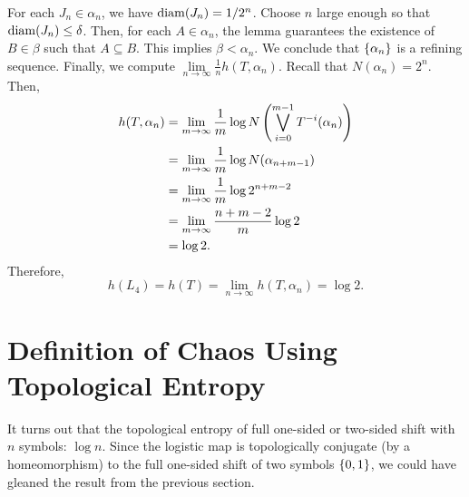 \documentclass[12pt,twoside,draft]{book}
\begin{document}
  For each $J_n \in \alpha_n$, we have $\mathrm{diam}(J_n) = 1/{2^n}$.
  Choose $n$ large enough so that $\mathrm{diam}(J_n) \leq \delta$.
  Then, for each $A \in \alpha_n$, the lemma guarantees the existence of $B \in \beta$ such that $A \subseteq B$.
  This implies $\beta < \alpha_n$.
  We conclude that $\left \{ \alpha_n \right \}$ is a refining sequence.
  Finally, we compute $\lim\limits_{n \to \infty} \frac{1}{n} h(T, \alpha_n)$.
  Recall that $N(\alpha_{n}) = 2^n$.
  Then,
  \begin{align*}
    h(T, \alpha_n)
    &= \lim\limits_{m \to \infty} \frac{1}{m} \log N\left (  \bigvee\limits_{i = 0}^{m-1} T^{-i}(\alpha_n) \right )  \\
    &= \lim\limits_{m \to \infty} \frac{1}{m} \log N(\alpha_{n+m-1})  \\
    &= \lim\limits_{m \to \infty} \frac{1}{m} \log 2^{n + m - 2}  \\
    &= \lim\limits_{m \to \infty} \frac{n + m - 2}{m} \log 2 \\
    &= \log 2.
  \end{align*}
  Therefore,
  \begin{equation*}
    h(L_4) = h(T) = \lim\limits_{n \to \infty} h(T, \alpha_n) = \log 2.
  \end{equation*}

  \section{Definition of Chaos Using Topological Entropy}
  It turns out that the topological entropy of full one-sided or two-sided shift with $n$ symbols: $\log n$. \citep[p.177]{walters}
  Since the logistic map is topologically conjugate (by a homeomorphism) to the full one-sided shift of two symbols $\left \{ 0,1 \right \}$, we could have gleaned the result from the previous section.
\end{document}
